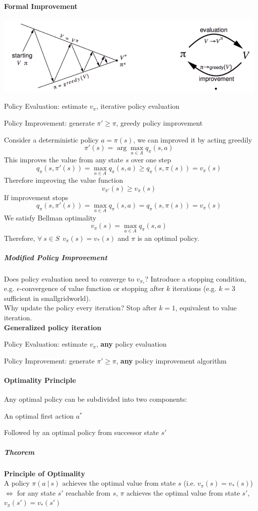 \documentclass[10pt]{report}
\begin{document}
\paragraph{Formal Improvement}
\begin{center}
	\includegraphics[scale=0.5]{165.png}
\end{center}
\begin{list}{}{}
	\item Policy Evaluation: estimate $v_\pi$, iterative policy evaluation
	\item Policy Improvement: generate $\pi' \geq \pi$, greedy policy improvement
\end{list}
Consider a deterministic policy $a=\pi(s)$, we can improved it by acting greedily $$\pi'(s)=\arg\max_{a\in A} q_\pi(s,a)$$
This improves the value from any state $s$ over one step $$q_\pi(s,\pi'(s)) = \max_{a\in A} q_\pi(s,a)\geq q_\pi(s,\pi(s)) = v_\pi(s)$$
Therefore improving the value function
$$v_{\pi'}(s)\geq v_\pi(s)$$
If improvement stops
$$q_\pi(s,\pi'(s)) = \max_{a\in A}q_\pi(s,a) = q_\pi(s, \pi(s)) = v_\pi(s)$$
We satisfy Bellman optimality
$$v_\pi(s) = \max_{a\in A}q_\pi(s,a)$$
Therefore, $\forall\:s\in S\:\:v_\pi(s) = v_*(s)$ and $\pi$ is an optimal policy.
\subparagraph{Modified Policy Improvement} Does policy evaluation need to converge to $v_{\pi_*}$? Introduce a stopping condition, e.g. $\epsilon$-convergence of value function or stopping after $k$ iterations (e.g. $k=3$ sufficient in smallgridworld).\\
Why update the policy every iteration? Stop after $k=1$, equivalent to value iteration.\\
\textbf{Generalized policy iteration}\begin{list}{}{}
	\item Policy Evaluation: estimate $v_\pi$, \textbf{any} policy evaluation
	\item Policy Improvement: generate $\pi' \geq \pi$, \textbf{any} policy improvement algorithm
\end{list}
\paragraph{Optimality Principle} Any optimal policy can be subdivided into two components:
\begin{list}{}{}
	\item An optimal first action $a^*$
	\item Followed by an optimal policy from successor state $s'$
\end{list}
\subparagraph{Theorem} \textbf{Principle of Optimality}\\
A policy $\pi(a\:|\:s)$ achieves the optimal value from state $s$ (i.e. $v_\pi(s) = v_*(s)$) $\Leftrightarrow$ for any state $s'$ reachable from $s$, $\pi$ achieves the optimal value from state $s'$, $v_\pi(s') = v_*(s')$
\end{document}
